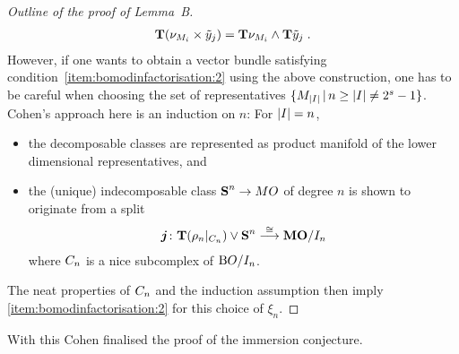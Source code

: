 \begin{proof}[Outline of the proof of Lemma~B]
\begin{gather*}
    \bm{\mathrm{T}}{(\nu_{M_i} \times \tilde y_j)}
    = \bm{\mathrm{T}}{\nu_{M_i}} \wedge \bm{\mathrm{T}}{\tilde y_j}
    \;.
  \end{gather*}
  However, if one wants to obtain a vector bundle satisfying
  condition~\ref{item:bomodinfactorisation:2} using the above
  construction, one has to be careful when choosing the
  set of representatives $\{M_{\left|I\right|}\,|\, n\geq\left|I\right|\neq 2^s-1\}$.
  Cohen's approach here is an induction on $n$:
  For $\left|I\right|=n$,
  \begin{itemize}
  \item the decomposable classes are represented as product
    manifold of the lower dimensional representatives, and
  \item the (unique) indecomposable class $\bm{\mathrm{S}}^{n}\to MO$ of degree
    $n$ is shown to originate from a split
    \begin{gather*}
      \bm{j}\colon
      \bm{\mathrm{T}}{(\rho_n|_{C_{n}})} \vee \bm{\mathrm{S}}^{n}
      \overset{\cong}\longrightarrow \bm{\mathrm{MO}}/I_{n}
    \end{gather*}
    where $C_{n}$ is a nice subcomplex of $\mathrm{B}O/I_{n}$.
  \end{itemize}
  The neat properties of $C_{n}$ and the induction assumption
  then imply \ref{item:bomodinfactorisation:2} for this choice of
  $\xi_n$.
\end{proof}

With this Cohen finalised the proof of the immersion conjecture.



